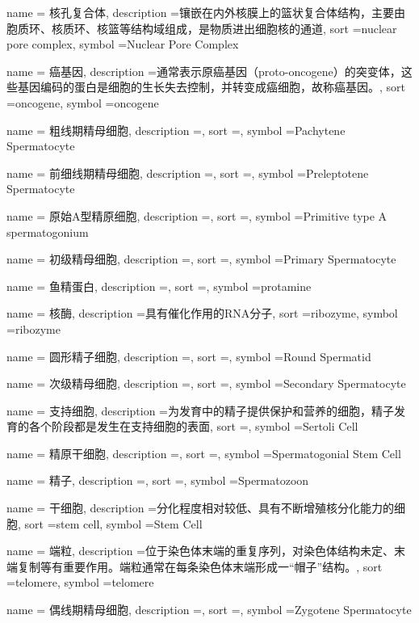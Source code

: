 {
	name = {核孔复合体},
	description ={镶嵌在内外核膜上的篮状复合体结构，主要由胞质环、核质环、核篮等结构域组成，是物质进出细胞核的通道},
	sort ={nuclear pore complex},
	symbol ={Nuclear Pore Complex}
}

{
	name = {癌基因},
	description ={通常表示原癌基因（proto-oncogene）的突变体，这些基因编码的蛋白是细胞的生长失去控制，并转变成癌细胞，故称癌基因。},
	sort ={oncogene},
	symbol ={oncogene}
}

{
	name = {粗线期精母细胞},
	description ={},
	sort ={},
	symbol ={Pachytene Spermatocyte}
}

{
	name = {前细线期精母细胞},
	description ={},
	sort ={},
	symbol ={Preleptotene Spermatocyte}
}

{
	name = {原始A型精原细胞},
	description ={},
	sort ={},
	symbol ={Primitive type A spermatogonium}
}

{
	name = {初级精母细胞},
	description ={},
	sort ={},
	symbol ={Primary Spermatocyte}
}

{
	name = {鱼精蛋白},
	description ={},
	sort ={},
	symbol ={protamine}
}

{
	name = {核酶},
	description ={具有催化作用的RNA分子},
	sort ={ribozyme},
	symbol ={ribozyme}
}

{
	name = {圆形精子细胞},
	description ={},
	sort ={},
	symbol ={Round Spermatid}
}

{
	name = {次级精母细胞},
	description ={},
	sort ={},
	symbol ={Secondary Spermatocyte}
}

{
	name = {支持细胞},
	description ={为发育中的精子提供保护和营养的细胞，精子发育的各个阶段都是发生在支持细胞的表面},
	sort ={},
	symbol ={Sertoli Cell}
}

{
	name = {精原干细胞},
	description ={},
	sort ={},
	symbol ={Spermatogonial Stem Cell}
}

{
	name = {精子},
	description ={},
	sort ={},
	symbol ={Spermatozoon}
}

{
	name = {干细胞},
	description ={分化程度相对较低、具有不断增殖核分化能力的细胞},
	sort ={stem cell},
	symbol ={Stem Cell}
}

{
	name = {端粒},
	description ={位于染色体末端的重复序列，对染色体结构未定、末端复制等有重要作用。端粒通常在每条染色体末端形成一“帽子”结构。},
	sort ={telomere},
	symbol ={telomere}
}

{
	name = {偶线期精母细胞},
	description ={},
	sort ={},
	symbol ={Zygotene Spermatocyte}
}

